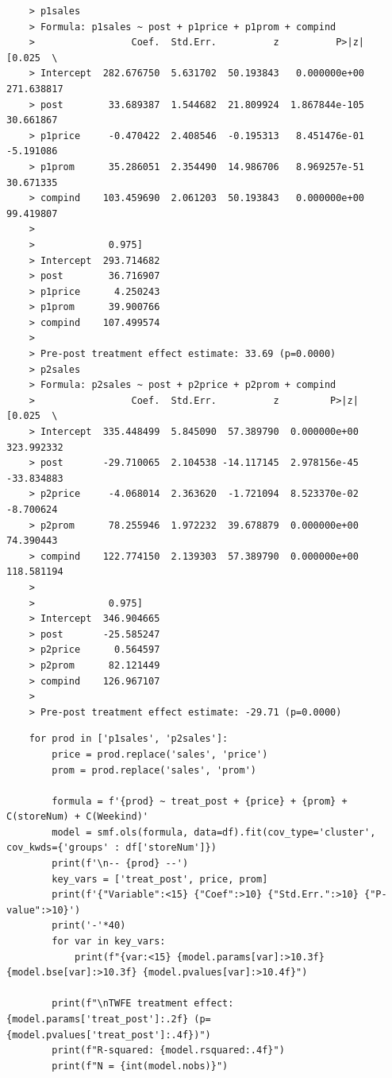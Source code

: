 \documentclass[10pt]{article}
\begin{document}
\begin{verbatim}
    > p1sales
    > Formula: p1sales ~ post + p1price + p1prom + compind
    >                 Coef.  Std.Err.          z          P>|z|      [0.025  \
    > Intercept  282.676750  5.631702  50.193843   0.000000e+00  271.638817   
    > post        33.689387  1.544682  21.809924  1.867844e-105   30.661867   
    > p1price     -0.470422  2.408546  -0.195313   8.451476e-01   -5.191086   
    > p1prom      35.286051  2.354490  14.986706   8.969257e-51   30.671335   
    > compind    103.459690  2.061203  50.193843   0.000000e+00   99.419807   
    > 
    >             0.975]  
    > Intercept  293.714682  
    > post        36.716907  
    > p1price      4.250243  
    > p1prom      39.900766  
    > compind    107.499574  
    > 
    > Pre-post treatment effect estimate: 33.69 (p=0.0000)
    > p2sales
    > Formula: p2sales ~ post + p2price + p2prom + compind
    >                 Coef.  Std.Err.          z         P>|z|      [0.025  \
    > Intercept  335.448499  5.845090  57.389790  0.000000e+00  323.992332   
    > post       -29.710065  2.104538 -14.117145  2.978156e-45  -33.834883   
    > p2price     -4.068014  2.363620  -1.721094  8.523370e-02   -8.700624   
    > p2prom      78.255946  1.972232  39.678879  0.000000e+00   74.390443   
    > compind    122.774150  2.139303  57.389790  0.000000e+00  118.581194   
    > 
    >             0.975]  
    > Intercept  346.904665  
    > post       -25.585247  
    > p2price      0.564597  
    > p2prom      82.121449  
    > compind    126.967107  
    > 
    > Pre-post treatment effect estimate: -29.71 (p=0.0000)
\end{verbatim}
\begin{lstlisting}
    for prod in ['p1sales', 'p2sales']:
        price = prod.replace('sales', 'price')
        prom = prod.replace('sales', 'prom')

        formula = f'{prod} ~ treat_post + {price} + {prom} + C(storeNum) + C(Weekind)'
        model = smf.ols(formula, data=df).fit(cov_type='cluster', cov_kwds={'groups' : df['storeNum']})
        print(f'\n-- {prod} --')
        key_vars = ['treat_post', price, prom]
        print(f'{"Variable":<15} {"Coef":>10} {"Std.Err.":>10} {"P-value":>10}')
        print('-'*40)
        for var in key_vars:
            print(f"{var:<15} {model.params[var]:>10.3f} {model.bse[var]:>10.3f} {model.pvalues[var]:>10.4f}")

        print(f"\nTWFE treatment effect: {model.params['treat_post']:.2f} (p={model.pvalues['treat_post']:.4f})")
        print(f"R-squared: {model.rsquared:.4f}")
        print(f"N = {int(model.nobs)}")
\end{lstlisting}
\end{document}
